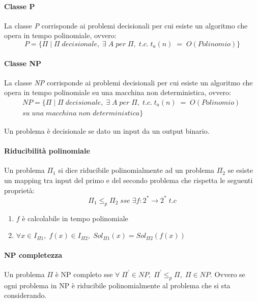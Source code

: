 \paragraph{Classe P}
La classe \emph{P} corrisponde ai problemi decisionali 
per cui esiste un algoritmo che opera
in tempo polinomiale, ovvero: 
$$P = \{\Pi\;|\;\Pi\;decisionale, \; \exists\;A\;per\;\Pi,\;t.c.\;t_a(n)\;=\;O(Polinomio)\}$$

\paragraph{Classe NP}
La classe \emph{NP} corrisponde ai problemi decisionali 
per cui esiste un algoritmo che opera
in tempo polinomiale su una macchina non deterministica, ovvero: 
\begin{equation}
    \begin{aligned}
        \mathit{NP} = \{\Pi\;|\;\Pi\;decisionale, \; \exists\;A\;per\;\Pi,\; t.c.\;t_a(n)\;=\;O(Polinomio)\;
        \\su\;una\;macchina\;non\;deterministica\}
    \end{aligned}
\end{equation}

\begin{remark}
    Un problema è decisionale se dato un input da un output binario.
\end{remark}

\paragraph{Riducibilità polinomiale}
Un problema $\Pi_1$ si dice riducibile polinomialmente ad un problema $\Pi_2$ se esiste 
un mapping tra input del primo e del secondo problema che rispetta le seguenti proprietà:
$$\Pi_1 \leqslant _p \Pi_2 \;sse\; \exists f : 2^* \rightarrow 2^*\; t.c$$
\begin{enumerate}
    \item $f$ è calcolabile in tempo polinomiale
    \item $\forall x \in I_{\Pi1},\;f(x) \in I_{\Pi2},\; Sol_{\Pi1}(x) = Sol_{\Pi2}(f(x))$ 
\end{enumerate}

\paragraph{NP completezza}
Un problema $\Pi$ è NP completo sse $\forall\;\Pi^\prime \in NP,\; \Pi^\prime \leqslant _p \Pi, \; \Pi \in NP$.
Ovvero se ogni problema in NP è riducibile polinomialmente al problema che si sta 
considerando.

